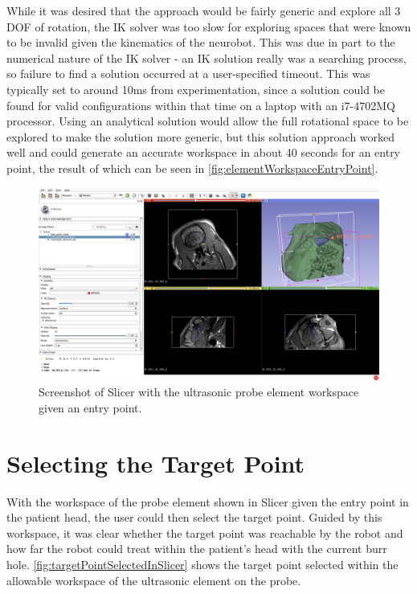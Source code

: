 \documentclass[12pt]{report}
\begin{document}
While it was desired that the approach would be fairly generic and explore all 3 DOF of rotation, the IK solver was too slow for exploring spaces that were known to be invalid given the kinematics of the neurobot. This was due in part to the numerical nature of the IK solver - an IK solution really was a searching process, so failure to find a solution occurred at a user-specified timeout. This was typically set to around 10ms from experimentation, since a solution could be found for valid configurations within that time on a laptop with an i7-4702MQ processor.  Using an analytical solution would allow the full rotational space to be explored to make the solution more generic, but this solution approach worked well and could generate an accurate workspace in about 40 seconds for an entry point, the result of which can be seen in \autoref{fig:elementWorkspaceEntryPoint}.

\begin{figure}[thpb]
	\centering
	\includegraphics[width=\textwidth]{images/slicer_workspace_given_entry.png}
    \caption{Screenshot of Slicer with the ultrasonic probe element workspace given an entry point.}
    \label{fig:elementWorkspaceEntryPoint}
\end{figure}


\section{Selecting the Target Point}
With the workspace of the probe element shown in Slicer given the entry point in the patient head, the user could then select the target point. Guided by this workspace, it was clear whether the target point was reachable by the robot and how far the robot could treat within the patient's head with the current burr hole. \autoref{fig:targetPointSelectedInSlicer} shows the target point selected within the allowable workspace of the ultrasonic element on the probe.
\end{document}
